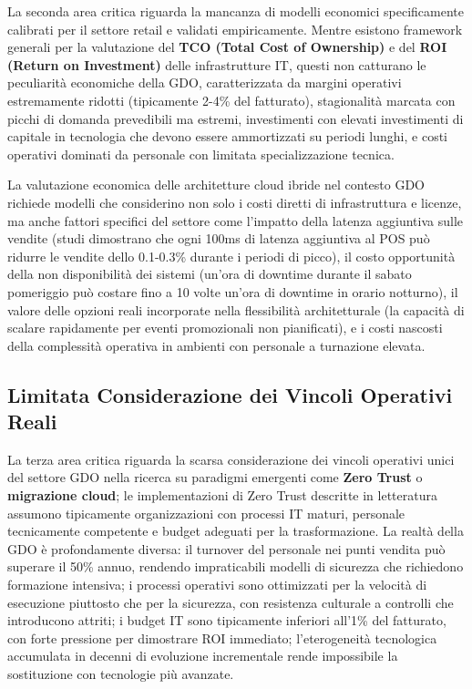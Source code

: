 La seconda area critica riguarda la mancanza di modelli economici specificamente calibrati per il settore retail e validati empiricamente. Mentre esistono framework generali per la valutazione del \textbf{TCO (Total Cost of Ownership)} e del \textbf{ROI (Return on Investment) }delle infrastrutture IT, questi non catturano le peculiarità economiche della GDO, caratterizzata da margini operativi estremamente ridotti (tipicamente 2-4\% del fatturato), stagionalità marcata con picchi di domanda prevedibili ma estremi, investimenti con elevati investimenti di capitale in tecnologia che devono essere ammortizzati su periodi lunghi, e costi operativi dominati da personale con limitata specializzazione tecnica.

La valutazione economica delle architetture cloud ibride nel contesto GDO richiede modelli che considerino non solo i costi diretti di infrastruttura e licenze, ma anche fattori specifici del settore come l'impatto della latenza aggiuntiva sulle vendite (studi dimostrano che ogni 100ms di latenza aggiuntiva al POS può ridurre le vendite dello 0.1-0.3\% durante i periodi di picco), il costo opportunità della non disponibilità dei sistemi (un'ora di downtime durante il sabato pomeriggio può costare fino a 10 volte un'ora di downtime in orario notturno), il valore delle opzioni reali incorporate nella flessibilità architetturale (la capacità di scalare rapidamente per eventi promozionali non pianificati), e i costi nascosti della complessità operativa in ambienti con personale a turnazione elevata.

\subsection{Limitata Considerazione dei Vincoli Operativi Reali}

La terza area critica riguarda la scarsa considerazione dei vincoli operativi unici del settore GDO nella ricerca su paradigmi emergenti come \textbf{Zero Trust} o \textbf{migrazione cloud}; le implementazioni di Zero Trust descritte in letteratura assumono tipicamente organizzazioni con processi IT maturi, personale tecnicamente competente e budget adeguati per la trasformazione. La realtà della GDO è profondamente diversa: il turnover del personale nei punti vendita può superare il 50\% annuo, rendendo impraticabili modelli di sicurezza che richiedono formazione intensiva; i processi operativi sono ottimizzati per la velocità di esecuzione piuttosto che per la sicurezza, con resistenza culturale a controlli che introducono attriti; i budget IT sono tipicamente inferiori all'1\% del fatturato, con forte pressione per dimostrare ROI immediato; l'eterogeneità tecnologica accumulata in decenni di evoluzione incrementale rende impossibile la sostituzione con tecnologie più avanzate.

